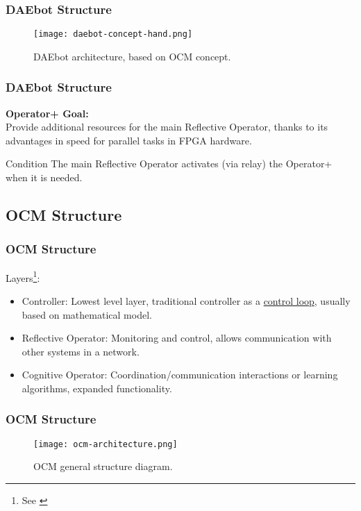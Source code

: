 \begin{frame}
	\frametitle{DAEbot Structure}
	\begin{figure}
		\texttt{[image: daebot-concept-hand.png]}
		\caption{DAEbot architecture, based on OCM concept.}\label{fig:daebot-concept-hand}
	\end{figure}
\end{frame}

\begin{frame}
	\frametitle{DAEbot Structure}
	\textbf{\LARGE{Operator+ Goal:}} \\
	\large{Provide additional resources for the main Reflective Operator, thanks to its advantages in speed for parallel tasks in FPGA hardware.}
	\pause
	\vfill
	\begin{exampleblock}{Condition}
		The main Reflective Operator activates (via relay) the Operator+ when it is needed.
	\end{exampleblock}
\end{frame}

\subsection{OCM Structure}

\begin{frame}
	\frametitle{OCM Structure}
	{\Large Layers\footnote[frame]{See \cite{Lueckel2001}}:}
	\begin{itemize}
		\pause
		\item Controller: Lowest level layer, traditional controller as a \underline{control loop}, usually based on mathematical model.
		\pause
		\item Reflective Operator: Monitoring and control, allows communication with other systems in a network.
		\pause
		\item Cognitive Operator: Coordination/communication interactions or learning algorithms, expanded functionality.
	\end{itemize}
\end{frame}

\begin{frame}
	\frametitle{OCM Structure}
	\begin{figure}
		\texttt{[image: ocm-architecture.png]}
		\caption{OCM general structure diagram.}\label{fig:ocm-architecture}
	\end{figure}
\end{frame}
